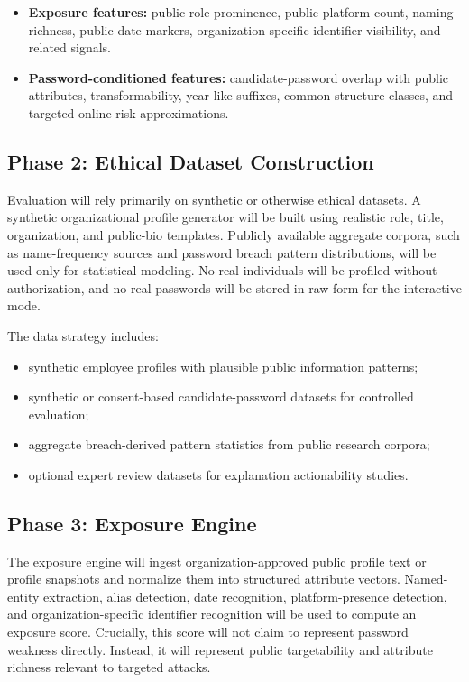 \documentclass[11pt]{article}
\begin{document}
\begin{itemize}[leftmargin=*]
  \item \textbf{Exposure features:} public role prominence, public platform count, naming richness, public date markers, organization-specific identifier visibility, and related signals.
  \item \textbf{Password-conditioned features:} candidate-password overlap with public attributes, transformability, year-like suffixes, common structure classes, and targeted online-risk approximations.
\end{itemize}

\subsection{Phase 2: Ethical Dataset Construction}
Evaluation will rely primarily on synthetic or otherwise ethical datasets. A synthetic organizational profile generator will be built using realistic role, title, organization, and public-bio templates. Publicly available aggregate corpora, such as name-frequency sources and password breach pattern distributions, will be used only for statistical modeling. No real individuals will be profiled without authorization, and no real passwords will be stored in raw form for the interactive mode.

The data strategy includes:

\begin{itemize}[leftmargin=*]
  \item synthetic employee profiles with plausible public information patterns;
  \item synthetic or consent-based candidate-password datasets for controlled evaluation;
  \item aggregate breach-derived pattern statistics from public research corpora;
  \item optional expert review datasets for explanation actionability studies.
\end{itemize}

\subsection{Phase 3: Exposure Engine}
The exposure engine will ingest organization-approved public profile text or profile snapshots and normalize them into structured attribute vectors. Named-entity extraction, alias detection, date recognition, platform-presence detection, and organization-specific identifier recognition will be used to compute an exposure score. Crucially, this score will not claim to represent password weakness directly. Instead, it will represent public targetability and attribute richness relevant to targeted attacks.
\end{document}

